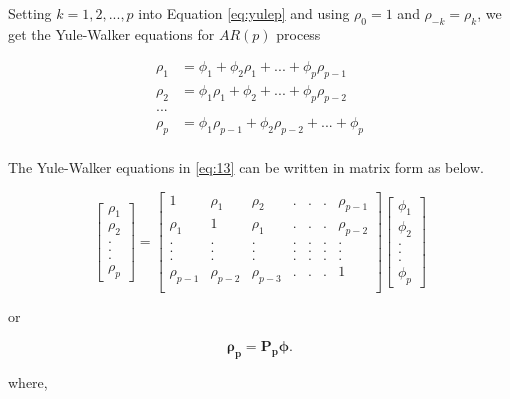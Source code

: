 \documentclass[]{book}
\begin{document}
Setting \(k=1, 2, ..., p\) into Equation \eqref{eq:yulep} and using \(\rho_0=1\) and \(\rho_{-k}=\rho_k\), we get the Yule-Walker equations for \(AR(p)\) process

\begin{equation}
  \label{eq:13}
\begin{aligned}
  \rho_1 &= \phi_1+\phi_2 \rho_{1} + ... + \phi_p \rho_{p-1}\\
  \rho_2 &= \phi_1 \rho_1+\phi_2  + ... + \phi_p \rho_{p-2}\\
  ... \\
  \rho_p &= \phi_1 \rho_{p-1} +\phi_2 \rho_{p-2}  + ... + \phi_p \\
\end{aligned}
\end{equation}

The Yule-Walker equations in \eqref{eq:13} can be written in matrix form as below.

\[\left[\begin{array}
{r}
\rho_1  \\
\rho_2  \\
.\\
.\\
.\\
\rho_p
\end{array}\right] = \left[\begin{array}
{rrrrrrr}
1 & \rho_1 & \rho_2 & .&.&.& \rho_{p-1} \\
\rho_1 & 1 & \rho_1 & .&.&.& \rho_{p-2} \\
. & . & . & .&.&.& . \\
. & . & . & .&.&.& . \\
. & . & . & .&.&.& . \\
\rho_{p-1} & \rho_{p-2} & \rho_{p-3} & .&.&.& 1 \\
\end{array}\right] \left[\begin{array}
{r}
\phi_1  \\
\phi_2  \\
.\\
.\\
.\\
\phi_p
\end{array}\right]
\]

or

\[\symbf{{\rho_{p}}}  = \symbf{{P_{p}\phi}}.\]

where,
\end{document}

